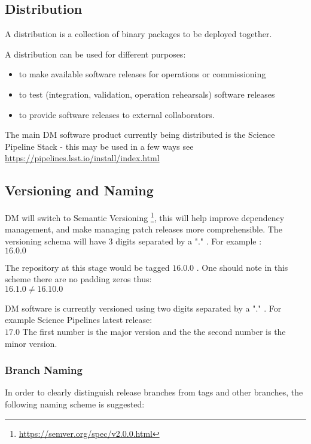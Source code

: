 \subsection{Distribution} \label{sec:distribution}

A distribution is a collection of binary packages to be deployed together.

A distribution can be used for different purposes:

\begin{itemize}
\item to make available software releases for operations or commissioning
\item to test (integration, validation, operation rehearsals) software releases
\item to provide software releases to external collaborators.
\end{itemize}

The main DM software product currently being distributed is the Science Pipeline Stack -
this may be used in a few ways see \url{https://pipelines.lsst.io/install/index.html}


\newpage
\subsection{Versioning and Naming} \label{sec:versioning}
DM will  switch to Semantic Versioning \footnote{\url{https://semver.org/spec/v2.0.0.html}},  this will help improve dependency management, and make  managing patch releases more comprehensible.
The versioning schema will have 3 digits separated by a "." . For example :
\\
$16.0.0$

The repository at this stage would be tagged $16.0.0$ .
One should note in this scheme there are no padding zeros thus:
\\
$16.1.0   \neq 16.10.0$

DM software is currently versioned using two digits separated by a "." .
For example Science Pipelines latest release:\\
$17.0$
The first number is the major version and the the second number is the minor version.



\subsubsection{Branch Naming}

In order to clearly distinguish release branches from tags and other branches, the following naming scheme is suggested:

